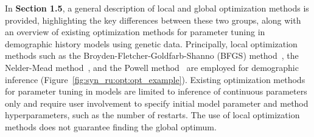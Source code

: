 In \textbf{Section 1.5}, a general description of local and global optimization methods is provided, highlighting the key differences between these two groups, along with an overview of existing optimization methods for parameter tuning in demographic history models using genetic data.
Principally, local optimization methods such as the Broyden-Fletcher-Goldfarb-Shanno (BFGS) method~\cite{broyden1970convergence, fletcher1970new, goldfarb1970family, shanno1970conditioning}, the Nelder-Mead method~\cite{nelder1965simplex}, and the Powell method~\cite{powell1964efficient} are employed for demographic inference (Figure~\ref{fig:syn_ru:opt:opt_example}).
Existing optimization methods for parameter tuning in models are limited to inference of continuous parameters only and require user involvement to specify initial model parameter and method hyperparameters, such as the number of restarts.
The use of local optimization methods does not guarantee finding the global optimum.

